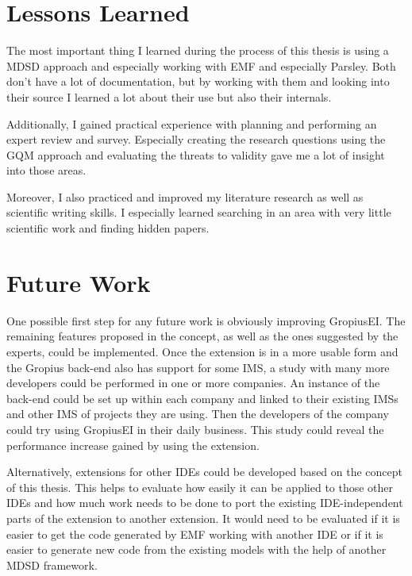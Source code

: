 \section{Lessons Learned}
\label{sec:ch6:s4}
The most important thing I learned during the process of this thesis is using a \gls{MDSD} approach 
and especially working with \gls{EMF} and especially \gls{Parsley}.
Both don't have a lot of documentation, but by working with them and looking into their source I learned a lot about their use but also their internals.

Additionally, I gained practical experience with planning and performing an expert review and survey.
Especially creating the research questions using the \gls{GQM} approach and evaluating the threats to validity gave me a lot of insight into those areas.

Moreover, I also practiced and improved my literature research as well as scientific writing skills.
I especially learned searching in an area with very little scientific work and finding hidden papers.

\section{Future Work}
\label{sec:ch6:s5}
One possible first step for any future work is obviously improving \gls{GropiusEI}.
The remaining features proposed in the concept, as well as the ones suggested by the experts, could be implemented.
Once the extension is in a more usable form and the \gls{Gropius} back-end also has support for some \gls{IMS},
a study with many more developers could be performed in one or more companies.
An instance of the back-end could be set up within each company and linked to their existing \glspl{IMS} and other \gls{IMS} of projects they are using.
Then the developers of the company could try using \gls{GropiusEI} in their daily business.
This study could reveal the performance increase gained by using the extension.

Alternatively, extensions for other \glspl{IDE} could be developed based on the concept of this thesis.
This helps to evaluate how easily it can be applied to those other \glspl{IDE} and how much work needs to be done to port the existing \gls{IDE}-independent parts of the extension to another extension.
It would need to be evaluated if it is easier to get the code generated by \gls{EMF} working with another \gls{IDE} or if it is easier to generate new code from the existing models with the help of another \gls{MDSD} framework. 